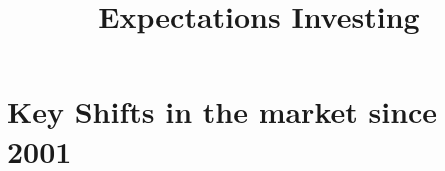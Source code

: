 \documentclass[english,titlepage]{article}
\begin{document}
\title{\textbf{Expectations Investing} \\ 
\date{}
}
\maketitle
\section{Key Shifts in the market since 2001}
\end{document}
